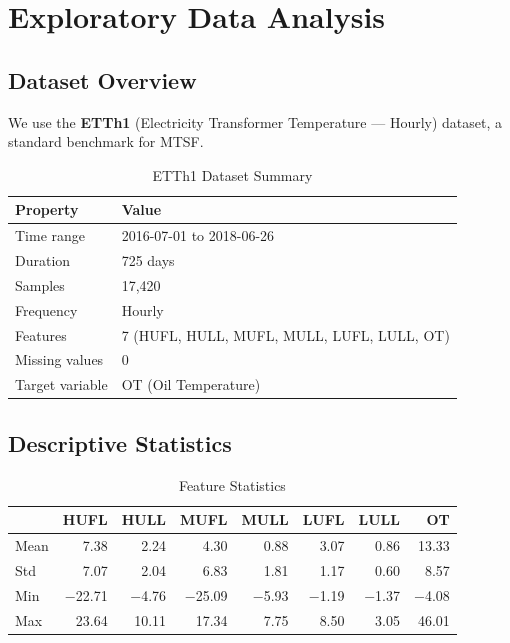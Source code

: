 \documentclass[12pt,a4paper]{article}
\begin{document}
\section{Exploratory Data Analysis}

\subsection{Dataset Overview}

We use the \textbf{ETTh1} (Electricity Transformer Temperature --- Hourly) dataset, a standard benchmark for MTSF.

\begin{table}[H]
\centering
\caption{ETTh1 Dataset Summary}
\label{tab:dataset}
\begin{tabular}{ll}
\toprule
\textbf{Property} & \textbf{Value} \\
\midrule
Time range & 2016-07-01 to 2018-06-26 \\
Duration & 725 days \\
Samples & 17,420 \\
Frequency & Hourly \\
Features & 7 (HUFL, HULL, MUFL, MULL, LUFL, LULL, OT) \\
Missing values & 0 \\
Target variable & OT (Oil Temperature) \\
\bottomrule
\end{tabular}
\end{table}

\subsection{Descriptive Statistics}

\begin{table}[H]
\centering
\caption{Feature Statistics}
\label{tab:stats}
\begin{tabular}{lrrrrrrr}
\toprule
& \textbf{HUFL} & \textbf{HULL} & \textbf{MUFL} & \textbf{MULL} & \textbf{LUFL} & \textbf{LULL} & \textbf{OT} \\
\midrule
Mean  &  7.38 & 2.24 & 4.30 & 0.88 & 3.07 & 0.86 & 13.33 \\
Std   &  7.07 & 2.04 & 6.83 & 1.81 & 1.17 & 0.60 &  8.57 \\
Min   & $-$22.71 & $-$4.76 & $-$25.09 & $-$5.93 & $-$1.19 & $-$1.37 & $-$4.08 \\
Max   & 23.64 & 10.11 & 17.34 & 7.75 & 8.50 & 3.05 & 46.01 \\
\bottomrule
\end{tabular}
\end{table}
\end{document}
